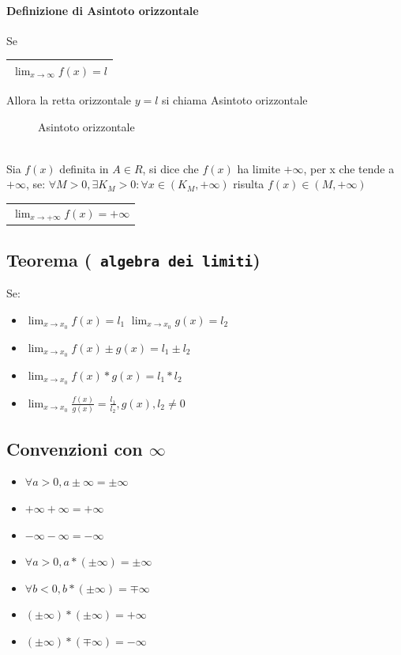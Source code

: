 \paragraph{Definizione di Asintoto orizzontale} Se \begin{tabular}{|l|}
	\hline
	$\lim_{x\to \infty}f(x)=l$\\\hline
\end{tabular} Allora la retta orizzontale $\boxed{y=l}$ si chiama Asintoto orizzontale
\begin{figure}[!ht]
	\centering
	\caption{Asintoto orizzontale}
\end{figure}\\
Sia $f(x)$ definita in $A \in R$, si dice che $f(x)$ ha limite $+\infty$, per x
che tende a $+\infty$, se: $\forall M>0, \exists K_M >0: \forall x \in (K_M,
+\infty)$ risulta $f(x)\in (M,+\infty)$ \begin{tabular}{|l|}
	$\lim_{x\to +\infty}f(x) = +\infty$
\end{tabular}
\subsection{Teorema (\texttt{\color{red} algebra dei limiti})}
Se:
\begin{itemize}
	\item $\lim_{x\to x_0} f(x)=l_1$ $\lim_{x\to x_0} g(x) = l_2$
	\item $\lim_{x\to x_0} f(x)\pm g(x)=l_1\pm l_2$
	\item $\lim_{x\to x_0} f(x)*g(x)=l_1*l_2$
	\item $\lim_{x\to x_0} \frac{f(x)}{g(x)}=\frac{l_1}{l_2}, g(x), l_2\neq 0$

\end{itemize}
\subsection{Convenzioni con $\infty$}
\begin{itemize}
	\item $\forall a >0, a\pm \infty=\pm \infty$
	\item $+\infty+\infty=+\infty$
	\item $-\infty-\infty=-\infty$
	\item $\forall a> 0, a*(\pm \infty)=\pm \infty$
	\item $\forall b< 0, b*(\pm \infty)=\mp \infty$
	\item $(\pm\infty)*(\pm \infty)=+\infty$
	\item $(\pm\infty)*(\mp \infty)=-\infty$

\end{itemize}
